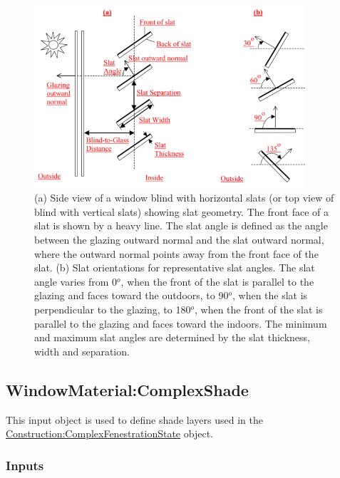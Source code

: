 \begin{figure}[hbtp] %
\centering
\includegraphics[width=0.9\textwidth, height=0.9\textheight, keepaspectratio=true]{media/image035.png}
\caption{(a) Side view of a window blind with horizontal slats (or top view of blind with vertical slats) showing slat geometry. The front face of a slat is shown by a heavy line. The slat angle is defined as the angle between the glazing outward normal and the slat outward normal, where the outward normal points away from the front face of the slat. (b) Slat orientations for representative slat angles. The slat angle varies from 0\(^{o}\), when the front of the slat is parallel to the glazing and faces toward the outdoors,  to 90\(^{o}\), when the slat is perpendicular to the glazing, to 180\(^{o}\), when the front of the slat is parallel to the glazing and faces toward the indoors. The minimum and maximum slat angles are determined by the slat thickness, width and separation. \protect \label{fig:a-side-view-of-a-window-blind-with-horizontal}}
\end{figure}

\subsection{WindowMaterial:ComplexShade}\label{windowmaterialcomplexshade}

This input object is used to define shade layers used in the \hyperref[constructioncomplexfenestrationstate]{Construction:ComplexFenestrationState} object.

\subsubsection{Inputs}\label{inputs-24-003}

